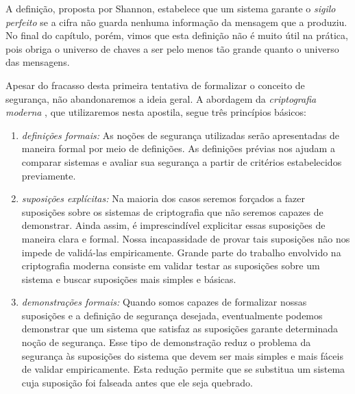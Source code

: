A definição, proposta por Shannon, estabelece que um sistema garante o {\em sigilo perfeito} se a cifra não guarda nenhuma informação da mensagem que a produziu.
No final do capítulo, porém, vimos que esta definição não é muito útil na prática, pois obriga o universo de chaves a ser pelo menos tão grande quanto o universo das mensagens.

Apesar do fracasso desta primeira tentativa de formalizar o conceito de segurança, não abandonaremos a ideia geral.
A abordagem da {\em criptografia moderna} \cite{Goldwasser84}, que utilizaremos nesta apostila, segue três princípios básicos:
\begin{enumerate}
\item {\em definições formais:} As noções de segurança utilizadas serão apresentadas de maneira formal por meio de definições.
As definições prévias nos ajudam a comparar sistemas e avaliar sua segurança a partir de critérios estabelecidos previamente.
\item {\em suposições explícitas:} Na maioria dos casos seremos forçados a fazer suposições sobre os sistemas de criptografia que não seremos capazes de demonstrar.
Ainda assim, é imprescindível explicitar essas suposições de maneira clara e formal.
Nossa incapassidade de provar tais suposições não nos impede de validá-las empiricamente.
Grande parte do trabalho envolvido na criptografia moderna consiste em validar testar as suposições sobre um sistema e buscar suposições mais simples e básicas.
\item {\em demonstrações formais:} Quando somos capazes de formalizar nossas suposições e a definição de segurança desejada, eventualmente podemos demonstrar que um sistema que satisfaz as suposições garante determinada noção de segurança.
Esse tipo de demonstração reduz o problema da segurança às suposições do sistema que devem ser mais simples e mais fáceis de validar empiricamente.
Esta redução permite que se substitua um sistema cuja suposição foi falseada antes que ele seja quebrado.
\end{enumerate}

